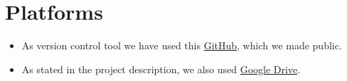 
%

\thispagestyle{empty}
\clearpage
\setcounter{page}{0}

\section{Platforms}

\begin{itemize}
 \item As version control tool we have used this \href{https://github.com/Leixb/UPC-ADSDB_e2e}{GitHub}, which we made public.
 \item As stated in the project description, we also used \href{https://drive.google.com/drive/folders/1RORV3pII7guhnsfO0GuWR57n5AwyvwB5}{Google Drive}.
\end{itemize}